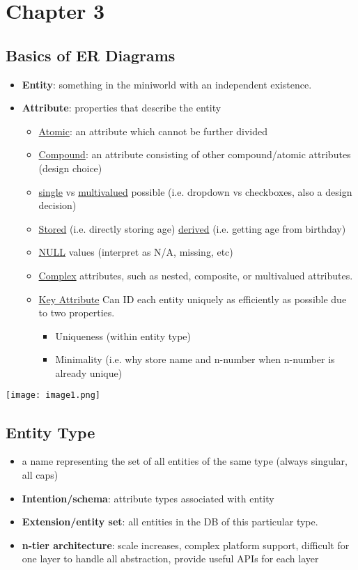 \documentclass[12pt]{report}
\begin{document}
	\chapter{Chapter 3}
	\section{Basics of ER Diagrams}
	\begin{itemize}
		\item \textbf{Entity}: something in the miniworld with an independent existence.
		\item \textbf{Attribute}: properties that describe the entity
		\begin{itemize}
			\item \underline{Atomic}: an attribute which cannot be further divided
			\item \underline{Compound}: an attribute consisting of other compound/atomic attributes (design choice)
			\item \underline{single} vs \underline{multivalued} possible (i.e. dropdown vs checkboxes, also a design decision)
			\item \underline{Stored} (i.e. directly storing age) \underline{derived} (i.e. getting age from birthday)
			\item \underline{NULL} values (interpret as N/A, missing, etc)
			\item \underline{Complex} attributes, such as nested, composite, or multivalued attributes.
			\item \underline{Key Attribute} Can ID each entity uniquely as efficiently as possible due to two properties.
			\begin{itemize}
				\item Uniqueness (within entity type)
				\item Minimality (i.e. why store name and n-number when n-number is already unique)
			\end{itemize}
		\end{itemize}
		
	\end{itemize}
	\texttt{[image: image1.png]}
	\section{Entity Type}
	\begin{itemize}
		\item a name representing the set of all entities of the same type (always singular, all caps)
		\item \textbf{Intention/schema}: attribute types associated with entity
		\item \textbf{Extension/entity set}: all entities in the DB of this particular type.
		\item \textbf{n-tier architecture}: scale increases, complex platform support, difficult for one layer to handle all abstraction, provide useful APIs for each layer
	\end{itemize}
\end{document}
